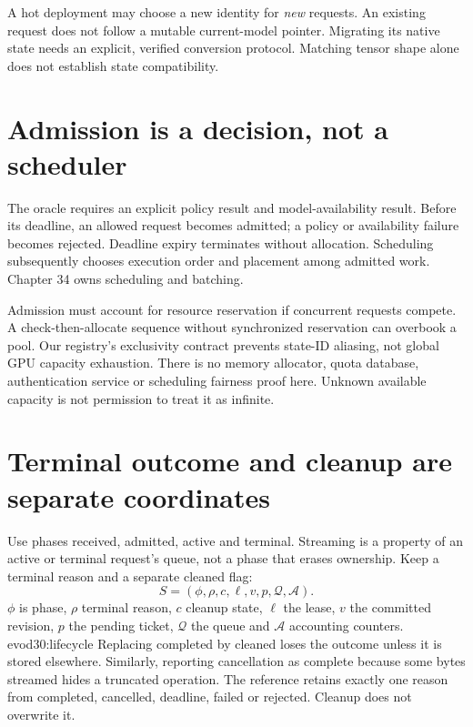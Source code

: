 A hot deployment may choose a new identity for \emph{new} requests.
An existing request does not follow a mutable current-model pointer.
Migrating its native state needs an explicit, verified conversion protocol.
Matching tensor shape alone does not establish state compatibility.

\section{Admission is a decision, not a scheduler}
The oracle requires an explicit policy result and model-availability result.
Before its deadline, an allowed request becomes admitted; a policy or availability
failure becomes rejected. Deadline expiry terminates without allocation.
Scheduling subsequently chooses execution order and placement among admitted
work. Chapter 34 owns scheduling and batching.

Admission must account for resource reservation if concurrent requests compete.
A check-then-allocate sequence without synchronized reservation can overbook a pool.
Our registry's exclusivity contract prevents state-ID aliasing, not global GPU
capacity exhaustion. There is no memory allocator, quota database, authentication
service or scheduling fairness proof here. Unknown available capacity is not
permission to treat it as infinite.

\section{Terminal outcome and cleanup are separate coordinates}
Use phases received, admitted, active and terminal. Streaming is a property of
an active or terminal request's queue, not a phase that erases ownership.
Keep a terminal reason and a separate cleaned flag:
\[
 S=(\phi,\rho,c,\ell,v,p,\mathcal Q,\mathcal A).
\]
$\phi$ is phase, $\rho$ terminal reason, $c$ cleanup state, $\ell$ the lease,
$v$ the committed revision, $p$ the pending ticket, $\mathcal Q$ the queue and
$\mathcal A$ accounting counters.
{evod30:lifecycle}
Replacing completed by cleaned loses the outcome unless it is stored elsewhere.
Similarly, reporting cancellation as complete because some bytes streamed hides
a truncated operation. The reference retains exactly one reason from completed,
cancelled, deadline, failed or rejected. Cleanup does not overwrite it.

